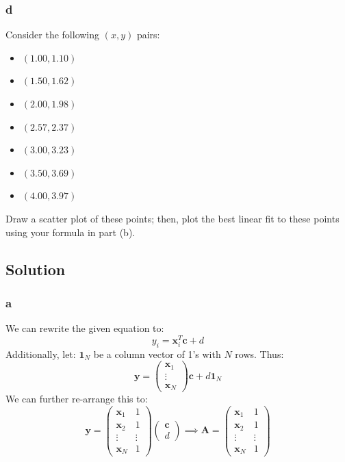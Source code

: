 \documentclass[11pt]{report}
\theoremstyle{definition}
\begin{document}
\subsubsection*{d}
Consider the following $(x,y)$ pairs:
\begin{itemize}[itemsep=0pt]
	\item $(1.00, 1.10)$
	\item $(1.50, 1.62)$
	\item $(2.00, 1.98)$
	\item $(2.57, 2.37)$
	\item $(3.00, 3.23)$
	\item $(3.50, 3.69)$
	\item $(4.00, 3.97)$
\end{itemize}
Draw a scatter plot of these points; then, plot the best linear fit to these points using your formula in part (b).

\subsection*{Solution}
\subsubsection*{a}
We can rewrite the given equation to:
\[y_i = \mathbf{x}_i^T \mathbf{c} + d\]
Additionally, let: $\mathbf{1}_N$ be a column vector of 1's with $N$ rows.
Thus:
\[
	\mathbf{y} = \begin{pmatrix}
		\mathbf{x}_1 \\
		\vdots       \\
		\mathbf{x}_N
	\end{pmatrix}
	\mathbf{c} + d\mathbf{1}_N
\]
We can further re-arrange this to:
\[
	\mathbf{y} = \begin{pmatrix}
		\mathbf{x}_1 & 1      \\
		\mathbf{x}_2 & 1      \\
		\vdots       & \vdots \\
		\mathbf{x}_N & 1
	\end{pmatrix}
	\begin{pmatrix}
		\mathbf{c} \\
		d
	\end{pmatrix}
	\implies
	\mathbf{A} = \begin{pmatrix}
		\mathbf{x}_1 & 1      \\
		\mathbf{x}_2 & 1      \\
		\vdots       & \vdots \\
		\mathbf{x}_N & 1
	\end{pmatrix}
\]
\end{document}
